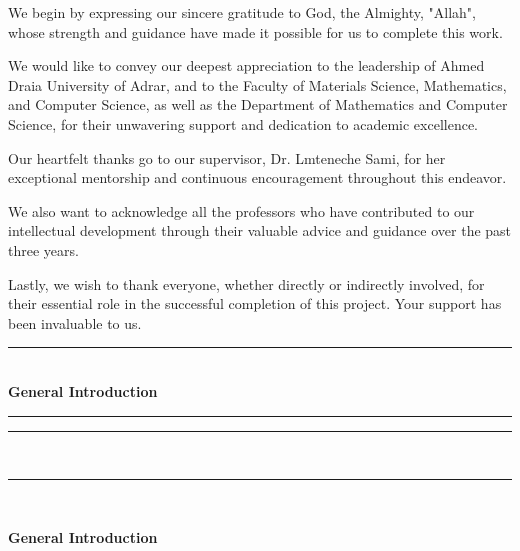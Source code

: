 \documentclass[12pt,a4paper]{report}
\begin{document}
\begin{Acknowledgment}
We begin by expressing our sincere gratitude to God, the Almighty, "Allah", whose strength and guidance have made it possible for us to complete this work.

We would like to convey our deepest appreciation to the leadership of Ahmed Draia University of Adrar, and to the Faculty of Materials Science, Mathematics, and Computer Science, as well as the Department of Mathematics and Computer Science, for their unwavering support and dedication to academic excellence.

Our heartfelt thanks go to our supervisor, Dr. Lmteneche Sami, for her exceptional mentorship and continuous encouragement throughout this endeavor.

We also want to acknowledge all the professors who have contributed to our intellectual development through their valuable advice and guidance over the past three years.

Lastly, we wish to thank everyone, whether directly or indirectly involved, for their essential role in the successful completion of this project. Your support has been invaluable to us.
\end{Acknowledgment}


\newpage
\tableofcontents
\newpage 

\newpage
\thispagestyle{empty}

\setcounter{chapter}{0}

{}

\vspace*{\fill}
\begin{center}
    {\color{mintgreen} \rule{\textwidth}{2pt} }\\[0.5cm]
    {\Huge \textbf{General Introduction}}\\[0.5cm]
    {\color{mintgreen} \rule{0.8\textwidth}{1.5pt} }
\end{center}
\vspace*{\fill}

\begin{center}
    {\color{mintgreen} \rule{0.8\textwidth}{1.5pt} }\\[0.3cm]
    {\color{mintgreen} \rule{\textwidth}{2pt} }
\end{center}


\
\newpage
\vspace{0.3cm}
\begin{tcolorbox}[
    colback=mintgreen!20, 
    colframe=mintgreen!80!black, 
    width=\textwidth, 
    boxrule=1pt, 
    arc=5pt, 
    auto outer arc,
    left=10pt,
    right=10pt,
    top=6pt,
    bottom=6pt
]
    \centering
    \Large \textbf{General Introduction}
\end{tcolorbox}
\end{document}
